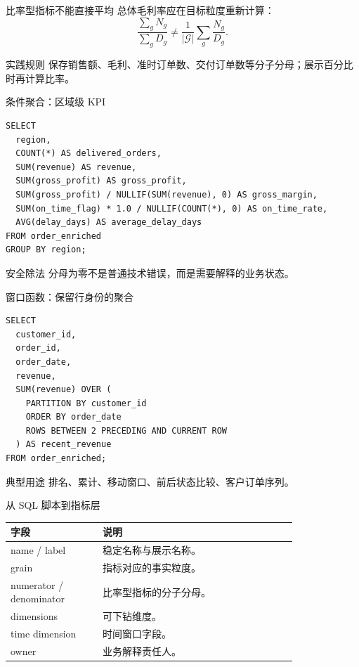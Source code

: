 \documentclass[UTF8,fontset=fandol,aspectratio=169,11pt]{ctexbeamer}
\begin{document}
\begin{frame}{比率型指标不能直接平均}
总体毛利率应在目标粒度重新计算：
\[
\frac{\sum_g N_g}{\sum_g D_g}
\ne
\frac{1}{|\mathcal G|}\sum_g\frac{N_g}{D_g}.
\]

\begin{block}{实践规则}
保存销售额、毛利、准时订单数、交付订单数等分子分母；展示百分比时再计算比率。
\end{block}
\end{frame}

\begin{frame}[fragile]{条件聚合：区域级 KPI}
\begin{lstlisting}
SELECT
  region,
  COUNT(*) AS delivered_orders,
  SUM(revenue) AS revenue,
  SUM(gross_profit) AS gross_profit,
  SUM(gross_profit) / NULLIF(SUM(revenue), 0) AS gross_margin,
  SUM(on_time_flag) * 1.0 / NULLIF(COUNT(*), 0) AS on_time_rate,
  AVG(delay_days) AS average_delay_days
FROM order_enriched
GROUP BY region;
\end{lstlisting}

\begin{alertblock}{安全除法}
分母为零不是普通技术错误，而是需要解释的业务状态。
\end{alertblock}
\end{frame}

\begin{frame}[fragile]{窗口函数：保留行身份的聚合}
\begin{lstlisting}
SELECT
  customer_id,
  order_id,
  order_date,
  revenue,
  SUM(revenue) OVER (
    PARTITION BY customer_id
    ORDER BY order_date
    ROWS BETWEEN 2 PRECEDING AND CURRENT ROW
  ) AS recent_revenue
FROM order_enriched;
\end{lstlisting}

\begin{block}{典型用途}
排名、累计、移动窗口、前后状态比较、客户订单序列。
\end{block}
\end{frame}

\begin{frame}{从 SQL 脚本到指标层}
\begin{table}
\small
\centering
\begin{tabular}{p{0.26\linewidth}p{0.55\linewidth}}
\toprule
字段 & 说明\\
\midrule
name / label & 稳定名称与展示名称。\\
grain & 指标对应的事实粒度。\\
numerator / denominator & 比率型指标的分子分母。\\
dimensions & 可下钻维度。\\
time dimension & 时间窗口字段。\\
owner & 业务解释责任人。\\
\bottomrule
\end{tabular}
\end{table}
\end{frame}
\end{document}
